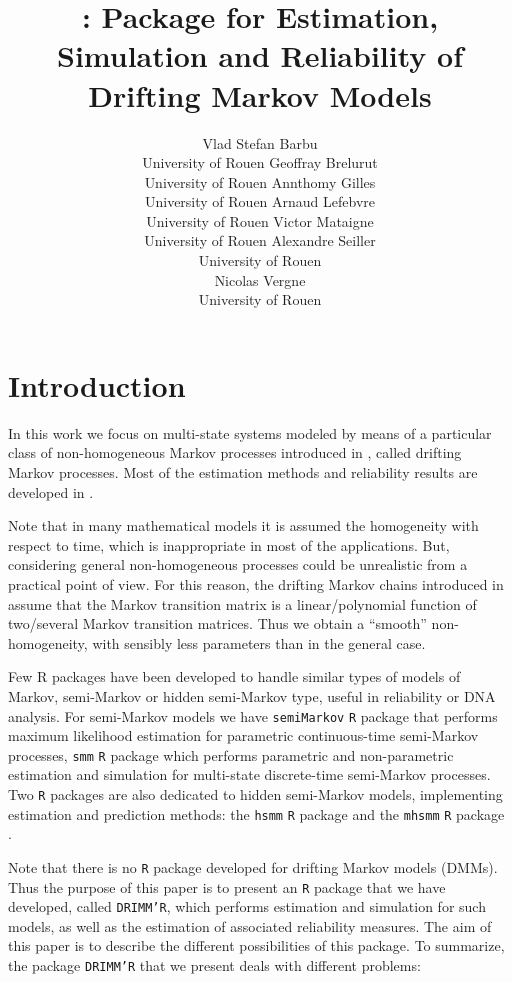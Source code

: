 \documentclass[article,nojss]{jss}\usepackage[]{graphicx}\usepackage[]{color}
\author{
Vlad Stefan Barbu\\University of Rouen \And Geoffray Brelurut\\University of Rouen \And Annthomy Gilles\\University of Rouen
\AND Arnaud Lefebvre\\University of Rouen \And Victor Mataigne \\University of Rouen \And Alexandre Seiller \\University of Rouen \\ \And Nicolas Vergne\\University of Rouen \\
}
\title{\pkg{drimmR} : \proglang{R} Package for Estimation, Simulation and Reliability of Drifting Markov Models}%
\begin{document}
\section{Introduction}

In this work we focus on multi-state systems modeled by means of a particular class of non-homogeneous Markov processes introduced in \citet{Ver08}, called drifting Markov processes. Most of the estimation methods and reliability results are developed in \citet{BaVe2018}.

Note that in many mathematical models it is assumed the homogeneity with respect to time, which is inappropriate in most of the applications. But, considering general non-homogeneous processes could be unrealistic from a practical point of view. For this reason, the drifting Markov chains introduced in  \citet{Ver08} assume that the Markov transition matrix is a linear/polynomial function of two/several Markov transition matrices.  Thus we obtain  a ``smooth'' non-homogeneity, with sensibly less parameters than in the general case.

Few R packages have been developed to handle similar types of models of Markov, semi-Markov or hidden semi-Markov type, useful in reliability or DNA analysis. For semi-Markov models we have {\tt semiMarkov} {\tt R} package \citet{krol_semimarkov_2015} that performs maximum likelihood estimation for parametric continuous-time semi-Markov processes, {\tt smm}  {\tt R} package \citep{BaBeCeSaVe} which performs parametric and non-parametric estimation and simulation for multi-state discrete-time semi-Markov processes. Two  {\tt R} packages are also dedicated to hidden semi-Markov models, implementing estimation and prediction methods: the {\tt hsmm} {\tt R} package \citet{bulla_hsmm_2010} and  the {\tt mhsmm}  {\tt R} package \citet{oconnell_hidden_2011}.

Note that there is no {\tt R} package  developed for drifting Markov models (DMMs). Thus the purpose of this paper is to present an {\tt R} package that we have developed, called {\tt DRIMM'R}, which performs estimation and simulation for such models, as well as the estimation of associated reliability measures. The aim of this paper is to describe the different possibilities of this package. To summarize, the package {\tt DRIMM'R} that we present deals with different problems:
\end{document}

